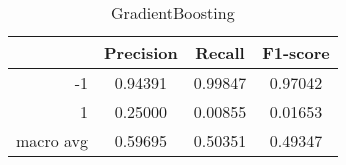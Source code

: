 \begin{table}[!h]
    \centering
    \renewcommand{\arraystretch}{1.5}
    \begin{tabular}{|r|c|c|c|}
        \hline
                  & Precision & Recall & F1-score \\ \hline
        -1        &     0.94391     &     0.99847   &    0.97042      \\ \hline
        1         &     0.25000      &     0.00855   &   0.01653       \\ \hline
        macro avg &      0.59695     &     0.50351   &    0.49347      \\ \hline
    \end{tabular}
    \caption{GradientBoosting}
\end{table}

